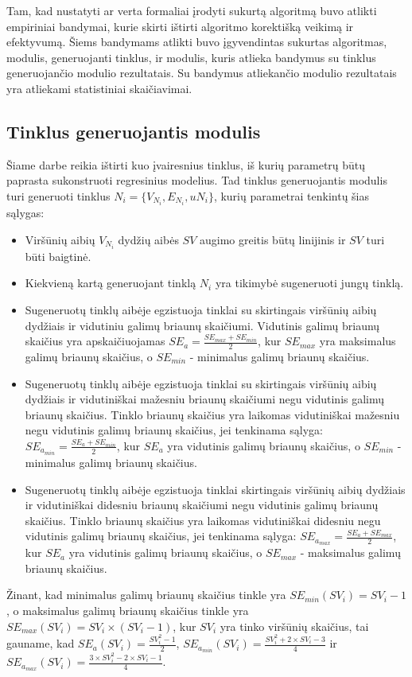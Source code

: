 Tam, kad nustatyti ar verta formaliai įrodyti sukurtą algoritmą buvo atlikti empiriniai bandymai, kurie skirti ištirti algoritmo korektišką veikimą ir efektyvumą. Šiems bandymams atlikti buvo įgyvendintas sukurtas algoritmas, modulis, generuojanti tinklus, ir modulis, kuris atlieka bandymus su tinklus generuojančio modulio rezultatais. Su bandymus atliekančio modulio rezultatais yra atliekami statistiniai skaičiavimai.

\subsection{Tinklus generuojantis modulis}

Šiame darbe reikia ištirti kuo įvairesnius tinklus, iš kurių parametrų būtų paprasta sukonstruoti regresinius modelius. Tad tinklus generuojantis modulis turi generuoti tinklus $N_i = \{V_{N_i}, E_{N_i}, u{N_i}\}$, kurių parametrai tenkintų šias sąlygas:
\begin{itemize}
	\item Viršūnių aibių  $V_{N_i}$ dydžių aibės $SV$ augimo greitis būtų linijinis ir $SV$ turi būti baigtinė.
	\item Kiekvieną kartą generuojant tinklą $N_i$ yra tikimybė sugeneruoti jungų tinklą.
	\item Sugeneruotų tinklų aibėje egzistuoja tinklai su skirtingais viršūnių aibių dydžiais ir vidutiniu galimų briaunų skaičiumi. Vidutinis galimų briaunų skaičius yra apskaičiuojamas $SE_a = \frac{SE_{max} + SE_{min}}{2}$, kur  $SE_{max}$ yra maksimalus galimų briaunų skaičius, o $SE_{min}$ - minimalus galimų briaunų skaičius.
	\item Sugeneruotų tinklų aibėje egzistuoja tinklai su skirtingais viršūnių aibių dydžiais ir vidutiniškai mažesniu briaunų skaičiumi negu vidutinis galimų briaunų skaičius.  Tinklo briaunų skaičius yra laikomas vidutiniškai mažesniu negu vidutinis galimų briaunų skaičius, jei tenkinama sąlyga: $SE_{a_{min}} = \frac{SE_a + SE_{min}}{2}$, kur $SE_a$ yra vidutinis galimų briaunų skaičius, o $SE_{min}$ - minimalus galimų briaunų skaičius.
	\item Sugeneruotų tinklų aibėje egzistuoja tinklai skirtingais viršūnių aibių dydžiais ir vidutiniškai didesniu briaunų skaičiumi negu vidutinis galimų briaunų skaičius.  Tinklo briaunų skaičius yra laikomas vidutiniškai didesniu negu vidutinis galimų briaunų skaičius, jei tenkinama sąlyga: $SE_{a_{max}} = \frac{SE_a + SE_{max}}{2}$, kur $SE_a$ yra vidutinis galimų briaunų skaičius, o $SE_{max}$ - maksimalus galimų briaunų skaičius.
\end{itemize}
Žinant, kad minimalus galimų briaunų skaičius tinkle yra $SE_{min}(SV_i)  = SV_i - 1$, o maksimalus galimų briaunų skaičius tinkle yra $SE_{max}(SV_i) = SV_i \times (SV_i - 1)$, kur $SV_i$ yra tinko viršūnių skaičius, tai gauname, kad  $SE_{a}(SV_i) =\frac{SV_i^2 - 1}{2}$, $SE_{a_{min}}(SV_i)  = \frac{SV_i^2 + 2 \times SV_i - 3}{4}$ ir $SE_{a_{max}}(SV_i) = \frac{3 \times SV_i^2 - 2 \times SV_i - 1}{4}$.

